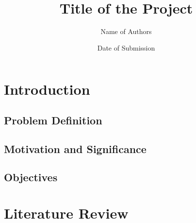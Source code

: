 \documentclass{article}
\title{Title of the Project}
\author{Name of Authors}
\date{Date of Submission}
\begin{document}







\tableofcontents

\section{Introduction}
\subsection{Problem Definition}
\subsection{Motivation and Significance}


\subsection{Objectives}


\section{Literature Review\cite{einstein}}

\end{document}
